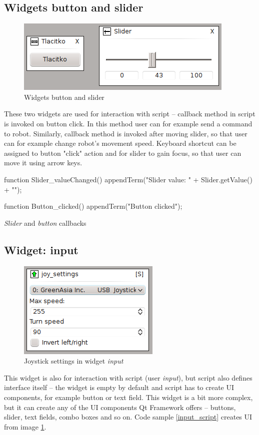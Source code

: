 \documentclass[12pt, a4paper, oneside]{article}
\newcommand{\It}{\textit}  %
\begin{document}
\subsection{Widgets button and slider}
\begin{figure}[H]
\begin{center}
\includegraphics[scale=1]{img/w_btn_slider.png}
\caption{Widgets button and slider}
\end{center}
\end{figure}
These two widgets are used for interaction with script -- callback method in script is invoked on button click. In this method user can for example send a command to robot. Similarly, callback method is invoked after moving slider, so that user can for example change robot's movement speed. Keyboard shortcut can be assigned to button "click" action and for slider to gain focus, so that user can move it using arrow keys.
\begin{listing}[H]
\begin{jscode}
function Slider_valueChanged() {
    appendTerm("Slider value: " + Slider.getValue() + "\n");
}

function Button_clicked() {
    appendTerm("Button clicked\n");
}
\end{jscode}
\caption{\It{Slider} and \It{button} callbacks}
\end{listing}

\subsection{Widget: input}
\begin{figure}[H]
\begin{center}
\includegraphics[scale=1]{img/w_input.png}
\caption{Joystick settings in widget \It{input}}
\label{input}
\end{center}
\end{figure}
This widget is also for interaction with script (user \It{input}), but script also defines interface itself -- the widget is empty by default and script has to create UI components, for example button or text field. This widget is a bit more complex, but it can create any of the UI components Qt Framework offers -- buttons, slider, text fields, combo boxes and so on. Code sample \ref{input_script} creates UI from image \ref{input}.
\end{document}
